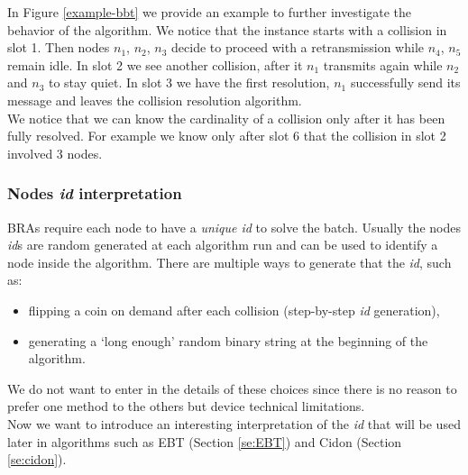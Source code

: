 \documentclass[11pt,a4paper,twoside,openright]{book}
\begin{document}
In Figure \ref{example-bbt} we provide an example to further investigate the behavior of the algorithm. We notice that the instance starts with a collision in slot 1. Then nodes $n_{1}$, $n_{2}$, $n_{3}$ decide to proceed with a retransmission while $n_{4}$, $n_{5}$ remain idle. In slot 2 we see another collision, after it $n_{1}$ transmits again while $n_{2}$ and $ n_{3}$ to stay quiet. In slot 3 we have the first resolution, $n_{1}$ successfully send its message and leaves the collision resolution algorithm.\\
We notice that we can know the cardinality of a collision only after it has been fully  resolved. For example we know only after slot 6 that the collision in slot 2 involved 3 nodes.\\

\subsubsection{Nodes \emph{id} interpretation}
\label{realvalueapproach}
BRAs require each node to have a \emph{unique id} to solve the batch. Usually the nodes \emph{id}s are random generated at each algorithm run and can be used to identify a node inside the algorithm. 
There are multiple ways to generate that the \emph{id}, such as:
\begin{itemize}
\item flipping a coin on demand after each collision (step-by-step \emph{id} generation),
\item generating a `long enough' random binary string  at the beginning of the algorithm.
\end{itemize}
We do not want to enter in the details of these choices since there is no reason to prefer one method to the others but device technical limitations.\\ 
Now we want to introduce an interesting interpretation of the \emph{id} that will be used later in algorithms such as EBT (Section \ref{se:EBT}) and Cidon (Section \ref{se:cidon}).\\
\end{document}
